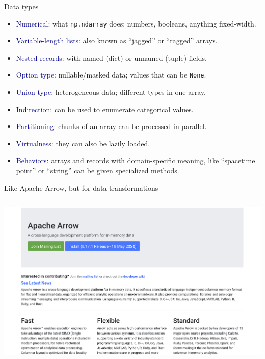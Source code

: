 \documentclass[aspectratio=169]{beamer}
\begin{document}
\begin{frame}{Data types }
\Large
\vspace{0.2 cm}

\begin{itemize}
\item<1-> \textcolor{darkblue}{Numerical:} what \texttt{np.ndarray} does: numbers, booleans, anything fixed-width.
\item<2-> \textcolor{darkblue}{Variable-length lists:} also known as ``jagged'' or ``ragged'' arrays.
\item<3-> \textcolor{darkblue}{Nested records:} with named (dict) or unnamed (tuple) fields.
\item<4-> \textcolor{darkblue}{Option type:} nullable/masked data; values that can be \texttt{None}.
\item<5-> \textcolor{darkblue}{Union type:} heterogeneous data; different types in one array.
\end{itemize}

\vspace{0.25 cm}
\begin{itemize}
\item<6-> \textcolor{darkblue}{Indirection:} can be used to enumerate categorical values.
\item<7-> \textcolor{darkblue}{Partitioning:} chunks of an array can be processed in parallel.
\item<8-> \textcolor{darkblue}{Virtualness:} they can also be lazily loaded.
\item<9-> \textcolor{darkblue}{Behaviors:} arrays and records with domain-specific meaning, like ``spacetime point'' or ``string'' can be given specialized methods.
\end{itemize}
\end{frame}

\begin{frame}{Like Apache Arrow, but for data transformations}
\vspace{0.25 cm}
\begin{columns}
\includegraphics[width=\linewidth]{img/apache-arrow.png}
\end{columns}
\end{frame}
\end{document}
